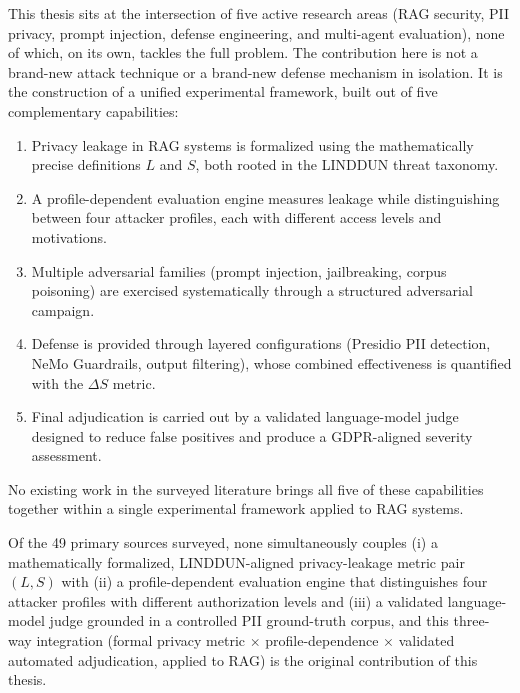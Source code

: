 \documentclass[11pt,a4paper]{report}
\begin{document}
\begin{notebox}
This thesis sits at the intersection of five active research areas (RAG security, PII privacy, prompt injection, defense engineering, and multi-agent evaluation), none of which, on its own, tackles the full problem. The contribution here is not a brand-new attack technique or a brand-new defense mechanism in isolation. It is the construction of a unified experimental framework, built out of five complementary capabilities:

\begin{enumerate}[leftmargin=1.5em, itemsep=3pt]
  \item Privacy leakage in RAG systems is formalized using the mathematically precise definitions $L$ and $S$, both rooted in the LINDDUN threat taxonomy.
  \item A profile-dependent evaluation engine measures leakage while distinguishing between four attacker profiles, each with different access levels and motivations.
  \item Multiple adversarial families (prompt injection, jailbreaking, corpus poisoning) are exercised systematically through a structured adversarial campaign.
  \item Defense is provided through layered configurations (Presidio PII detection, NeMo Guardrails, output filtering), whose combined effectiveness is quantified with the $\Delta S$ metric.
  \item Final adjudication is carried out by a validated language-model judge designed to reduce false positives and produce a GDPR-aligned severity assessment.
\end{enumerate}

No existing work in the surveyed literature brings all five of these capabilities together within a single experimental framework applied to RAG systems.
\end{notebox}

\begin{transitionbox}
Of the 49 primary sources surveyed, none simultaneously couples (i) a mathematically formalized, LINDDUN-aligned privacy-leakage metric pair $(L, S)$ with (ii) a profile-dependent evaluation engine that distinguishes four attacker profiles with different authorization levels and (iii) a validated language-model judge grounded in a controlled PII ground-truth corpus, and this three-way integration (formal privacy metric $\times$ profile-dependence $\times$ validated automated adjudication, applied to RAG) is the original contribution of this thesis.
\end{transitionbox}
\end{document}
